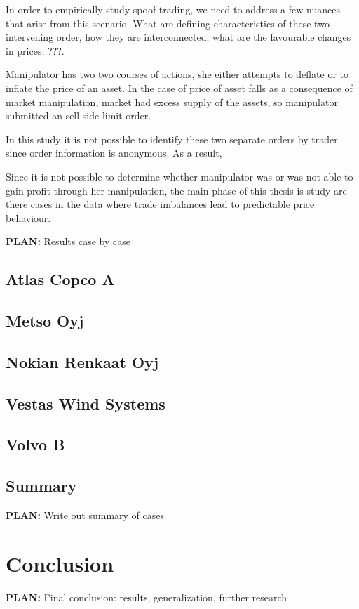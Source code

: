 \documentclass{tut-thesis}
\begin{document}
In order to empirically study spoof trading, we need to address a few nuances that arise from this scenario. What are defining characteristics of these two intervening order, how they are interconnected; what are the favourable changes in prices; ???. 

Manipulator has two two courses of actions, she either attempts to deflate or to inflate the price of an asset. In the case of price of asset falls as a consequence of market manipulation, market had excess supply of the assets, so manipulator submitted an sell side limit order. 

In this study it is not possible to identify these two separate orders by trader since order information is anonymous. As a result, 

Since it is not possible to determine whether manipulator was or was not able to gain profit through her manipulation, the main phase of this thesis is study are there cases in the data where trade imbalances lead to predictable price behaviour.

\textbf{PLAN:} Results case by case
\section{Atlas Copco A}
\section{Metso Oyj}
\section{Nokian Renkaat Oyj}
\section{Vestas Wind Systems}
\section{Volvo B}

\section{Summary}
\textbf{PLAN:} Write out summary of cases

\chapter{Conclusion}
\textbf{PLAN:} Final conclusion: results, generalization, further research

\begingroup
\let\itshape\upshape
\printbibliography{}
\endgroup
\end{document}
